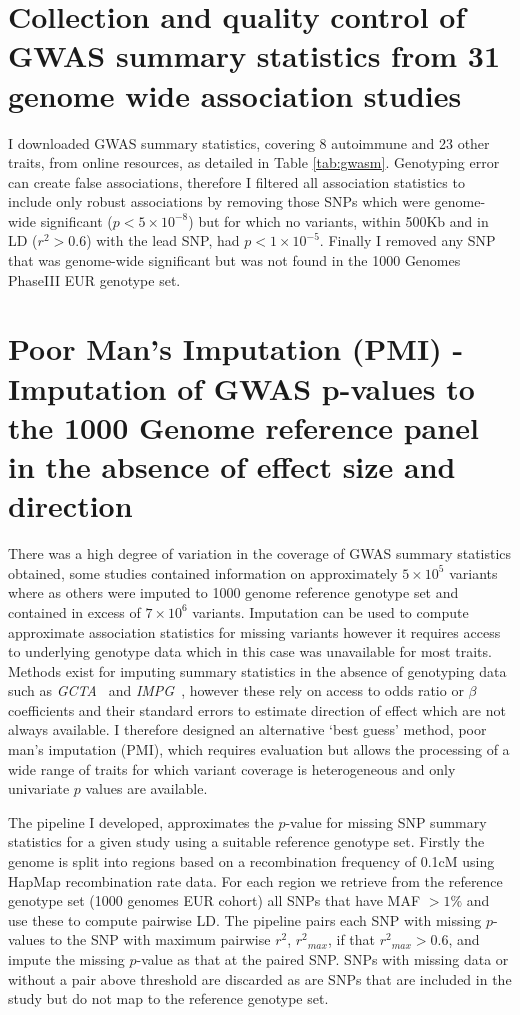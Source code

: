 \documentclass[a4paper,11pt]{report}
\begin{document}
\section{Collection and quality control of GWAS summary statistics from 31 genome wide association studies}
I downloaded GWAS summary statistics, covering 8 autoimmune and 23 other traits, from online resources, as detailed in Table \ref{tab:gwasm}. Genotyping error can create false associations,  therefore I filtered all association statistics to include only robust associations by removing those SNPs which were genome-wide significant ($p < 5 \times 10^{-8}$) but for which no variants, within 500Kb and in LD ($r^{2} > 0.6$) with the lead SNP, had $p < 1 \times 10^{-5}$. Finally I removed any SNP that was genome-wide significant but was not found in the 1000 Genomes PhaseIII EUR genotype set. 
\section{Poor Man's Imputation (PMI) - Imputation of GWAS p-values to the 1000 Genome reference panel in the absence of effect size and direction}
There was a high degree of variation in the coverage of GWAS summary statistics obtained, some studies contained information on approximately $5 \times 10^5$ variants where as others were imputed to 1000 genome reference genotype set and contained in excess of $7 \times 10^6$ variants. Imputation can be used to compute approximate association statistics for missing variants however it requires access to underlying genotype data which in this case was unavailable for most traits. Methods exist for imputing summary statistics in the absence of genotyping data such as \textit{GCTA}~\citep{YangLeeGoddardEtAl2011} and \textit{IMPG}~\citep{Pasaniuc2014-im}, however these rely on access to odds ratio or $\beta$ coefficients and their standard errors to estimate direction of effect which are not always available. I therefore designed an alternative `best guess' method, poor man's imputation (PMI), which requires evaluation but allows the processing of a wide range of traits for which variant coverage is heterogeneous and only univariate $p$ values are available.

The pipeline I developed, approximates the $p$-value for missing SNP summary statistics for a given study using a suitable reference genotype set. Firstly the genome is split into regions based on a recombination frequency of 0.1cM using HapMap recombination rate data. For each region we retrieve from the reference genotype set (1000 genomes EUR cohort) all SNPs that have MAF $ > 1\%$ and use these to compute pairwise LD. The pipeline pairs each SNP with missing $p$-values to the SNP with maximum pairwise $r^2$, ${r^2}_{max}$, if that ${r^2}_{max} > 0.6$, and impute the missing $p$-value as that at the paired SNP. SNPs with missing data or without a pair above threshold are discarded as are SNPs that are included in the study but do not map to the reference genotype set.
\end{document}
